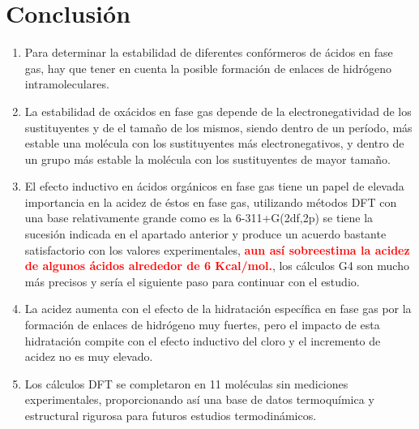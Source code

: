 \chapter{Conclusión}

\begin{enumerate}
	\item Para determinar la estabilidad de diferentes confórmeros de ácidos en fase gas, hay que tener en cuenta la posible formación de enlaces de hidrógeno intramoleculares.
	\item La estabilidad de oxácidos en fase gas depende de la electronegatividad de los sustituyentes y de el tamaño de los mismos, siendo dentro de un período, más estable una molécula con los sustituyentes más electronegativos, y dentro de un grupo más estable la molécula con los sustituyentes de mayor tamaño.
	\item El efecto inductivo en ácidos orgánicos en fase gas tiene un papel de elevada importancia en la acidez de éstos en fase gas, utilizando métodos DFT con una base relativamente grande como es la 6-311+G(2df,2p) se tiene la sucesión indicada en el apartado anterior y produce un acuerdo bastante satisfactorio con los valores experimentales,  {\bfseries\textcolor{red} {aun así sobreestima la acidez de algunos ácidos alrededor de 6 Kcal/mol.}}, los cálculos G4 son mucho más precisos y sería el siguiente paso para continuar con el estudio.
	\item La acidez aumenta con el efecto de la hidratación específica en fase gas por la formación de enlaces de hidrógeno muy fuertes, pero el impacto de esta hidratación compite con el efecto inductivo del cloro y el incremento de acidez no es muy elevado.
	\item Los cálculos DFT se completaron en 11 moléculas sin mediciones experimentales, proporcionando así una base de datos termoquímica y estructural rigurosa para futuros estudios termodinámicos.
	
	
\end{enumerate}
